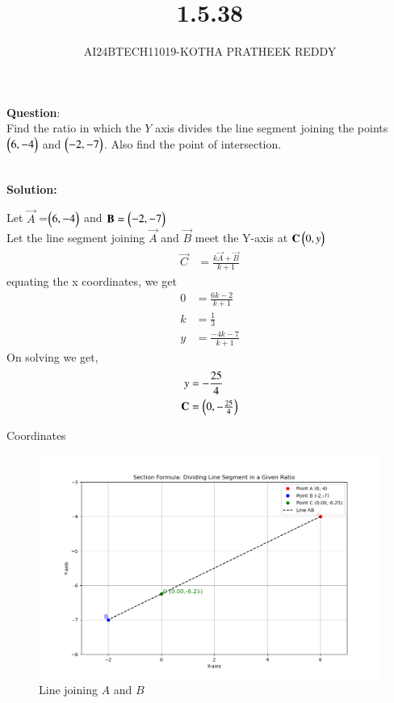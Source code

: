 \documentclass[journal]{IEEEtran}
\begin{document}

\vspace{3cm}

\title{1.5.38}
\author{AI24BTECH11019-KOTHA PRATHEEK REDDY}

 \maketitle
{\let\newpage\relax\maketitle}

\renewcommand{\thefigure}{\theenumi}
\renewcommand{\thetable}{\theenumi}
\setlength{\intextsep}{10pt} %


\renewcommand{\thetable}{\theenumi}


\textbf{Question}:\\  Find the ratio in which the $Y$ axis divides the line segment joining the points $\begin{pmatrix}6,-4\end{pmatrix}$
and $\begin{pmatrix}-2,-7\end{pmatrix}$. Also find the point of intersection.
  
\\
\textbf{Solution:}

Let  $\vec{A}$ =$\begin{pmatrix}6,-4\end{pmatrix}$ and $\mathbf{B}=\begin{pmatrix}-2,-7\end{pmatrix}$\\
Let the line segment joining $\vec{A}$ and $\vec{B}$ meet the Y-axis at $\mathbf{C}\begin{pmatrix}0,y\end{pmatrix}$ \\

\begin{align}
   \vec{C} &= \frac{k\vec{A}+\vec{B}}{k+1}
   \end{align}
   equating the x coordinates, we get 
   \begin{align}
    0 &= \frac{6k - 2}{k + 1}  \\
    k &= \frac{1}{3}  \\
    y &= \frac{-4k - 7}{k + 1} 
\end{align}
  On solving we get,
  \begin{align}
	y &= -\frac{25}{4}  \\
	\mathbf{C} &= \begin{pmatrix}0,-\frac{25}{4}\end{pmatrix} 
  \end{align}
  \begin{table}[H]
      \centering
      
      \caption{Coordinates}
      \label{}
  \end{table}



  

  \begin{figure}[h!]
   \centering
   \includegraphics[width=0.7\linewidth]{Figures/Figure_1.png}
	  \caption{Line joining $A$ and $B$}
   \label{stemplot}
\end{figure}

  
\end{document}

